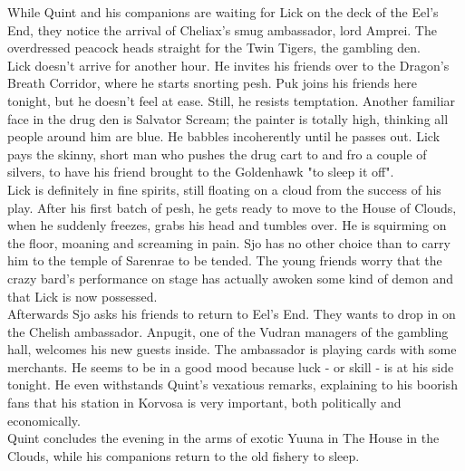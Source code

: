 While Quint and his companions are waiting for Lick on the deck of the Eel's End, they notice the arrival of Cheliax's smug ambassador, lord Amprei. The overdressed peacock heads straight for the Twin Tigers, the gambling den.\\

Lick doesn't arrive for another hour. He invites his friends over to the Dragon's Breath Corridor, where he starts snorting pesh. Puk joins his friends here tonight, but he doesn't feel at ease. Still, he resists temptation. Another familiar face in the drug den is Salvator Scream; the painter is totally high, thinking all people around him are blue. He babbles incoherently until he passes out. Lick pays the skinny, short man who pushes the drug cart to and fro a couple of silvers, to have his friend brought to the Goldenhawk "to sleep it off".\\

Lick is definitely in fine spirits, still floating on a cloud from the success of his play. After his first batch of pesh, he gets ready to move to the House of Clouds, when he suddenly freezes, grabs his head and tumbles over. He is squirming on the floor, moaning and screaming in pain. Sjo has no other choice than to carry him to the temple of Sarenrae to be tended. The young friends worry that the crazy bard's performance on stage has actually awoken some kind of demon and that Lick is now possessed.\\

Afterwards Sjo asks his friends to return to Eel's End. They wants to drop in on the Chelish ambassador. Anpugit, one of the Vudran managers of the gambling hall, welcomes his new guests inside. The ambassador is playing cards with some merchants. He seems to be in a good mood because luck - or skill - is at his side tonight. He even withstands Quint's vexatious remarks, explaining to his boorish fans that his station in Korvosa is very important, both politically and economically.\\

Quint concludes the evening in the arms of exotic Yuuna in The House in the Clouds, while his companions return to the old fishery to sleep.\\

